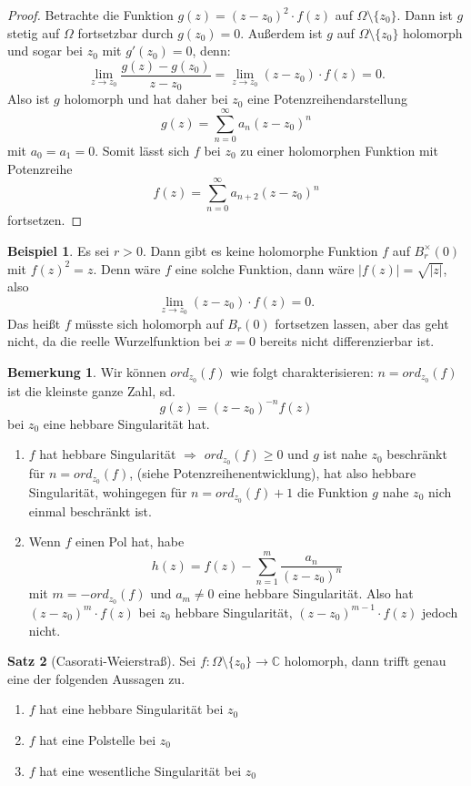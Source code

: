 \documentclass[11pt,titlepage]{article}
\theoremstyle{definition}
\newtheorem{theorem}{Satz}[section]
\newtheorem{example}[theorem]{Beispiel}
\newtheorem{remark}{Bemerkung}
\theoremstyle{remark}
\begin{document}
	\begin{proof}
		Betrachte die Funktion $g(z)=(z-z_0)^2 \cdot f(z)$ auf $\Omega\setminus\{z_0\}$. Dann ist 
		$g$ stetig auf $\Omega$ fortsetzbar durch $g(z_0)=0$. Außerdem ist $g$ auf 
		$\Omega\setminus\{z_0\}$ holomorph und sogar bei $z_0$ mit $g'(z_0)=0$, denn:
		\[ \lim_{z\to z_0} \frac{g(z)-g(z_0)}{z-z_0} = \lim_{z\to z_0} (z-z_0)\cdot f(z) =0. \]
		Also ist $g$ holomorph und hat daher bei $z_0$ eine Potenzreihendarstellung 
		\[g(z)=\sum_{n=0}^{\infty} a_n (z-z_0)^n \] mit $a_0=a_1=0$. Somit lässt sich $f$ bei $z_0$ 
		zu einer holomorphen Funktion mit Potenzreihe
		\[f(z)=\sum_{n=0}^{\infty} a_{n+2}(z-z_0)^n \]
		fortsetzen.
	\end{proof}
	
	\begin{example}
		Es sei $r>0$. Dann gibt es keine holomorphe Funktion $f$ auf $B_r^{\times}(0)$ mit $f(z)^2 =z$. 
		Denn wäre $f$ eine solche Funktion, dann wäre $|f(z)|=\sqrt{|z|}$, also 
		\[\lim_{z\to z_0} (z-z_0)\cdot f(z) =0. \]
		Das heißt $f$ müsste sich holomorph auf $B_r(0)$ fortsetzen lassen, aber das geht nicht, da die 
		reelle Wurzelfunktion bei $x=0$ bereits nicht differenzierbar ist.
	\end{example}
	
	\begin{remark}
		Wir können $ord_{z_0}(f)$ wie folgt charakterisieren: $n=ord_{z_0}(f)$ ist die kleinste ganze 
		Zahl, sd.
		\[ g(z)= (z-z_0)^{-n} f(z) \]
		bei $z_0$ eine hebbare Singularität hat. 
		\begin{enumerate}
			\item $f$ hat hebbare Singularität $\Rightarrow$ $ord_{z_0}(f)\geq 0$ und $g$ ist nahe 
			$z_0$ beschränkt für $n=ord_{z_0}(f)$, (siehe Potenzreihenentwicklung), hat also 
			hebbare Singularität, wohingegen für $n=ord_{z_0}(f)+1$ die Funktion $g$ nahe 
			$z_0$ nich einmal beschränkt ist.
			\item Wenn $f$ einen Pol hat, habe
			\[ h(z)=f(z)-\sum_{n=1}^m \frac{a_n}{(z-z_0)^n} \]
			mit $m=-ord_{z_0}(f)$ und $a_m \neq 0$ eine hebbare Singularität. Also hat 
			$(z-z_0)^m \cdot f(z)$ bei $z_0$ hebbare Singularität, $(z-z_0)^{m-1}\cdot f(z)$ jedoch 
			nicht.
		\end{enumerate}
	\end{remark}
	
	\begin{theorem}[Casorati-Weierstraß]
		Sei $f:\Omega\setminus\{z_0\}\to\mathbb{C}$ holomorph, dann trifft genau eine der folgenden 
		Aussagen zu.
		\begin{enumerate}
			\item $f$ hat eine hebbare Singularität bei $z_0$
			\item $f$ hat eine Polstelle bei $z_0$
			\item $f$ hat eine wesentliche Singularität bei $z_0$
		\end{enumerate}
	\end{theorem}
	
\end{document}
